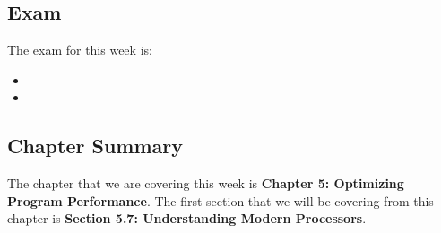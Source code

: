 \subsection{Exam}

The exam for this week is:

\begin{itemize}
    \item {}
    \item {} \textbullet {} 
\end{itemize}

\subsection{Chapter Summary}

The chapter that we are covering this week is \textbf{Chapter 5: Optimizing Program Performance}. The first section that we will be covering from this chapter is \textbf{Section 5.7: Understanding Modern Processors}.

